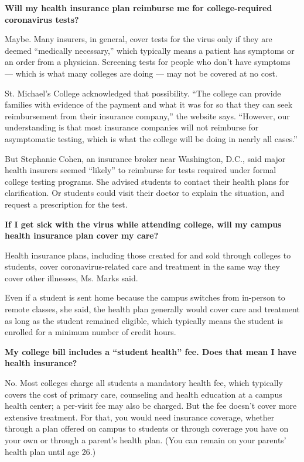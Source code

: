 \textbf{Will my health insurance plan reimburse me for college-required
coronavirus tests?}

Maybe. Many insurers, in general, cover tests for the virus only if they
are deemed ``medically necessary,'' which typically means a patient has
symptoms or an order from a physician. Screening tests for people who
don't have symptoms --- which is what many colleges are doing --- may
not be covered at no cost.

St. Michael's College acknowledged that possibility. ``The college can
provide families with evidence of the payment and what it was for so
that they can seek reimbursement from their insurance company,'' the
website says. ``However, our understanding is that most insurance
companies will not reimburse for asymptomatic testing, which is what the
college will be doing in nearly all cases.''

But Stephanie Cohen, an insurance broker near Washington, D.C., said
major health insurers seemed ``likely'' to reimburse for tests required
under formal college testing programs. She advised students to contact
their health plans for clarification. Or students could visit their
doctor to explain the situation, and request a prescription for the
test.

\textbf{If I get sick with the virus while attending college, will my
campus health insurance plan cover my care?}

Health insurance plans, including those created for and sold through
colleges to students, cover coronavirus-related care and treatment in
the same way they cover other illnesses, Ms. Marks said.

Even if a student is sent home because the campus switches from
in-person to remote classes, she said, the health plan generally would
cover care and treatment as long as the student remained eligible, which
typically means the student is enrolled for a minimum number of credit
hours.

\textbf{My college bill includes a ``student health'' fee. Does that
mean I have health insurance?}

No. Most colleges charge all students a mandatory health fee, which
typically covers the cost of primary care, counseling and health
education at a campus health center; a per-visit fee may also be
charged. But the fee doesn't cover more extensive treatment. For that,
you would need insurance coverage, whether through a plan offered on
campus to students or through coverage you have on your own or through a
parent's health plan. (You can remain on your parents' health plan until
age 26.)

